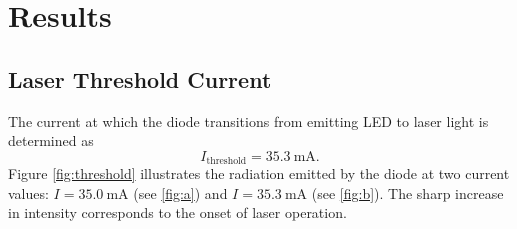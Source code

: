 \section{Results}
\subsection{Laser Threshold Current}

The current at which the diode transitions from emitting LED 
to laser light is determined as
\begin{equation*}
    I_\text{threshold}=\SI{35.3}{\milli\ampere}.
\end{equation*}
Figure \ref{fig:threshold} illustrates the radiation 
emitted by the diode at two current values: 
$I = \SI{35.0}{\milli\ampere}$ (see \ref{fig:a}) and 
$I = \SI{35.3}{\milli\ampere}$ (see \ref{fig:b}). 
The sharp increase in intensity corresponds to the 
onset of laser operation.

